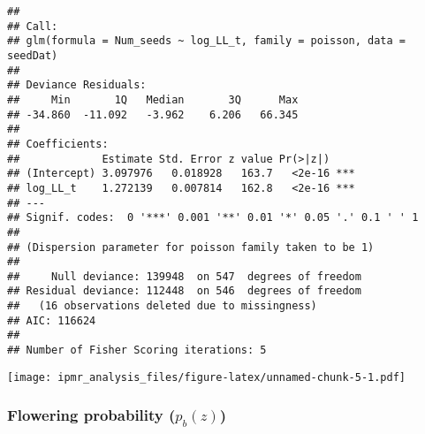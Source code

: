 \documentclass[
]{article}
\newenvironment{Shaded}{\begin{snugshade}}{\end{snugshade}}
\newcommand{\AttributeTok}[1]{\textcolor[rgb]{0.77,0.63,0.00}{#1}}
\newcommand{\ConstantTok}[1]{\textcolor[rgb]{0.00,0.00,0.00}{#1}}
\newcommand{\DecValTok}[1]{\textcolor[rgb]{0.00,0.00,0.81}{#1}}
\newcommand{\DocumentationTok}[1]{\textcolor[rgb]{0.56,0.35,0.01}{\textbf{\textit{#1}}}}
\newcommand{\FunctionTok}[1]{\textcolor[rgb]{0.00,0.00,0.00}{#1}}
\newcommand{\NormalTok}[1]{#1}
\newcommand{\OtherTok}[1]{\textcolor[rgb]{0.56,0.35,0.01}{#1}}
\newcommand{\SpecialCharTok}[1]{\textcolor[rgb]{0.00,0.00,0.00}{#1}}
\newcommand{\StringTok}[1]{\textcolor[rgb]{0.31,0.60,0.02}{#1}}
\begin{document}
\begin{verbatim}
## 
## Call:
## glm(formula = Num_seeds ~ log_LL_t, family = poisson, data = seedDat)
## 
## Deviance Residuals: 
##     Min       1Q   Median       3Q      Max  
## -34.860  -11.092   -3.962    6.206   66.345  
## 
## Coefficients:
##             Estimate Std. Error z value Pr(>|z|)    
## (Intercept) 3.097976   0.018928   163.7   <2e-16 ***
## log_LL_t    1.272139   0.007814   162.8   <2e-16 ***
## ---
## Signif. codes:  0 '***' 0.001 '**' 0.01 '*' 0.05 '.' 0.1 ' ' 1
## 
## (Dispersion parameter for poisson family taken to be 1)
## 
##     Null deviance: 139948  on 547  degrees of freedom
## Residual deviance: 112448  on 546  degrees of freedom
##   (16 observations deleted due to missingness)
## AIC: 116624
## 
## Number of Fisher Scoring iterations: 5
\end{verbatim}

\begin{Shaded}
\end{Shaded}

\texttt{[image: ipmr\_analysis\_files/figure-latex/unnamed-chunk-5-1.pdf]}

\hypertarget{flowering-probability-p_bz}{%
\subsubsection{\texorpdfstring{Flowering probability
(\(p_b(z)\))}{Flowering probability (p\_b(z))}}\label{flowering-probability-p_bz}}
\end{document}
